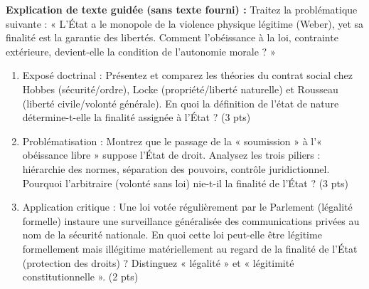 \documentclass[11pt]{article}
\begin{document}
\begin{exercice}
\textbf{Explication de texte guidée (sans texte fourni) :} Traitez la problématique suivante : « L'État a le monopole de la violence physique légitime (Weber), yet sa finalité est la garantie des libertés. Comment l'obéissance à la loi, contrainte extérieure, devient-elle la condition de l'autonomie morale ? »
\begin{enumerate}
    \item Exposé doctrinal : Présentez et comparez les théories du contrat social chez Hobbes (sécurité/ordre), Locke (propriété/liberté naturelle) et Rousseau (liberté civile/volonté générale). En quoi la définition de l'état de nature détermine-t-elle la finalité assignée à l'État ? (3 pts)
    \item Problématisation : Montrez que le passage de la « soumission » à l'« obéissance libre » suppose l'État de droit. Analysez les trois piliers : hiérarchie des normes, séparation des pouvoirs, contrôle juridictionnel. Pourquoi l'arbitraire (volonté sans loi) nie-t-il la finalité de l'État ? (3 pts)
    \item Application critique : Une loi votée régulièrement par le Parlement (légalité formelle) instaure une surveillance généralisée des communications privées au nom de la sécurité nationale. En quoi cette loi peut-elle être légitime formellement mais illégitime matériellement au regard de la finalité de l'État (protection des droits) ? Distinguez « légalité » et « légitimité constitutionnelle ». (2 pts)
\end{enumerate}
\end{exercice}
\end{document}
